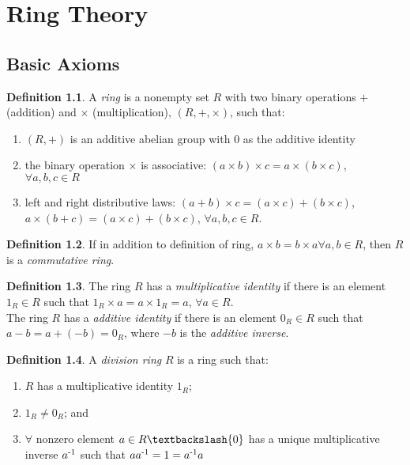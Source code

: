 \documentclass[a4paper,sfsidenotes,openany]{tufte-book}
\theoremstyle{definition}
\newtheorem{definition}{Definition}[section]
\begin{document}
\chapter{Ring Theory}
\begin{fullwidth}
\section{Basic Axioms}

\begin{definition}
A \textit{{\color{blue} ring}} is a nonempty set $ R $ with two binary operations $ + $ (addition) and $ \times $ (multiplication), $ (R, +, \times) $, such that:
\begin{enumerate}[label=(\roman*),leftmargin=0pt, itemindent=4em, align=left]
\item $(R, +)$ is an additive abelian group with $0$ as the additive identity
\item the binary operation $\times$ is associative: $(a \times b) \times c = a \times (b \times c) $, $ \forall a, b, c \in R$
\item left and right distributive laws: $(a+b) \times c = (a \times c) + (b \times c) $, $a \times (b+c) = (a \times c) + (b \times c)$, $\forall a, b, c \in R$.
\end{enumerate}
\end{definition}
\>

\begin{definition}
If in addition to definition of ring, $a \times b = b \times a \forall a, b \in R$, then $R$ is a \textit{{\color{blue} commutative ring}}.\\
\end{definition}
\>

\begin{definition}
The ring $R$ has a \textit{{\color{blue} multiplicative identity}} if there is an element $1_R \in R$ such that $1_R \times a = a \times 1_R = a$, $\forall a \in R$.\\
The ring $R$ has a \textit{{\color{blue} additive identity}} if there is an element $0_R \in R$ such that $a-b = a+(-b) = 0_R$, where $-b$ is the \textit{{\color{blue} additive inverse}}.\\
\end{definition}
\>

\begin{definition}
A \textit{{\color{blue} division ring}} $R$ is a ring such that:
\begin{enumerate}[label=(\roman*),leftmargin=0pt, itemindent=4em, align=left]
\item $R$ has a multiplicative identity $1_R$;
\item $1_R \neq 0_R$; and
\item $\forall$ nonzero element $a \in R \textbackslash \{0\}$ has a unique multiplicative inverse $a \textsuperscript{-1}$ such that $aa \textsuperscript{-1} = 1 = a \textsuperscript{-1} a$
\end{enumerate}
\end{definition}
\>


\end{fullwidth}
\end{document}
